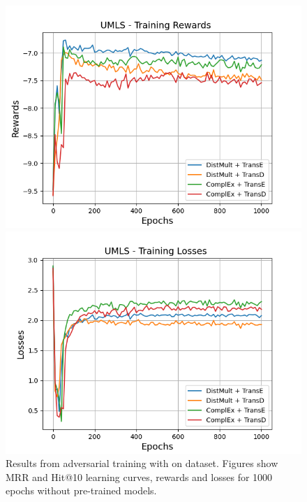 \begin{figure}[H]
    \begin{minipage}{.45\textwidth}
      \centering
      \includegraphics[width=0.9\linewidth]{figures/results/gan_train/not_pretrained/uncertainty/max/entropy/umls/1k_epochs/uncertainty_umls_rew.png}
    \end{minipage}%
     \begin{minipage}{.45\textwidth}
      \centering
      \includegraphics[width=0.9\linewidth]{figures/results/gan_train/not_pretrained/uncertainty/max/entropy/umls/1k_epochs/uncertainty_umls_losses.png}
    \end{minipage}%
    \caption{Results from adversarial training with \usmax on \umls dataset.
    Figures show MRR and Hit@10 learning curves, rewards and losses for 1000 epochs without pre-trained models.}
    \label{fig:gan_train_not_pretrained_usmax_umls}
\end{figure}
